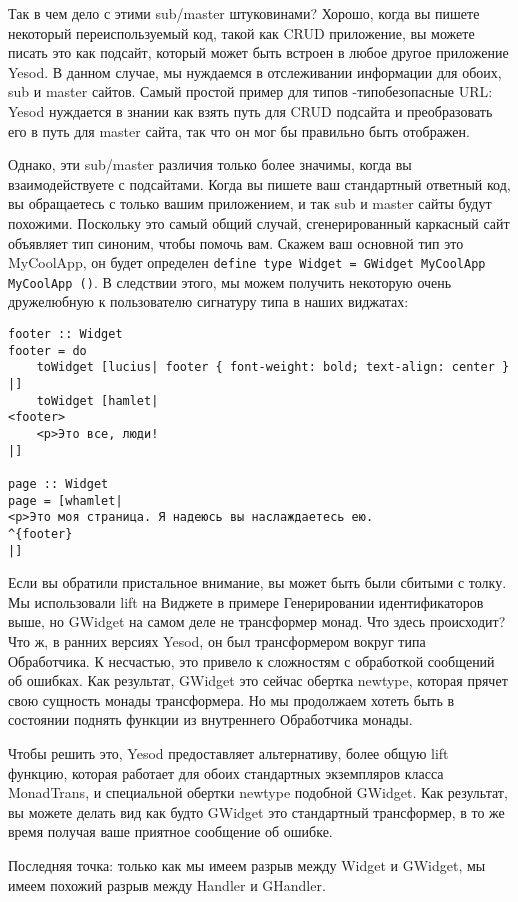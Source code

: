 Так в чем дело с этими sub/master штуковинами? Хорошо, когда вы пишете некоторый переиспользуемый код, такой как CRUD приложение, вы можете писать это как подсайт, который может быть встроен в любое другое приложение Yesod. В данном случае, мы нуждаемся в отслеживании информации для обоих, sub и master сайтов. Самый простой пример для типов -типобезопасные URL: Yesod нуждается в знании как взять путь для CRUD подсайта и преобразовать его в путь для master сайта, так что он мог бы правильно быть отображен.

Однако, эти sub/master различия только более значимы, когда вы взаимодействуете с подсайтами. Когда вы пишете ваш стандартный ответный код, вы обращаетесь с только вашим приложением, и так sub и master сайты будут похожими. Поскольку это самый общий случай, сгенерированный каркасный сайт объявляет тип синоним, чтобы помочь вам. Скажем ваш основной тип это MyCoolApp, он будет определен \lstinline'define type Widget = GWidget MyCoolApp MyCoolApp ()'. В следствии этого, мы можем получить некоторую очень дружелюбную к пользователю сигнатуру типа в наших виджатах:

\begin{lstlisting}
footer :: Widget
footer = do
    toWidget [lucius| footer { font-weight: bold; text-align: center } |]
    toWidget [hamlet|
<footer>
    <p>Это все, люди!
|]

page :: Widget
page = [whamlet|
<p>Это моя страница. Я надеюсь вы наслаждаетесь ею.
^{footer}
|]
\end{lstlisting}

Если вы обратили пристальное внимание, вы может быть были сбитыми с толку. Мы использовали lift на Виджете в примере Генерировании идентификаторов выше, но GWidget на самом деле не трансформер монад. Что здесь происходит? Что ж, в ранних версиях Yesod, он был трансформером вокруг типа Обработчика. К несчастью, это привело к сложностям с обработкой сообщений об ошибках. Как результат, GWidget это сейчас обертка newtype, которая прячет свою сущность монады трансформера. Но мы продолжаем хотеть быть в состоянии поднять функции из внутреннего Обработчика монады.

Чтобы решить это, Yesod предоставляет альтернативу, более общую lift функцию, которая работает для обоих стандартных экземпляров класса MonadTrans, и специальной обертки newtype подобной GWidget. Как результат, вы можете делать вид как будто GWidget это стандартный трансформер, в то же время получая ваше приятное сообщение об ошибке.

Последняя точка: только как мы имеем разрыв между Widget и GWidget, мы имеем похожий разрыв между Handler и GHandler.

